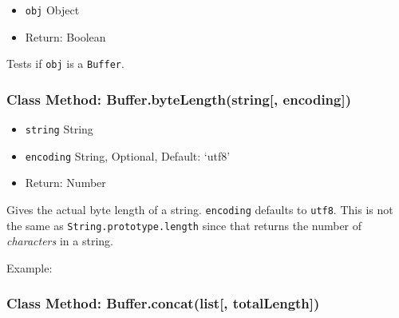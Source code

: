 \begin{itemize}
\itemsep1pt\parskip0pt
\item
  \texttt{obj} Object
\item
  Return: Boolean
\end{itemize}

Tests if \texttt{obj} is a \texttt{Buffer}.

\subsubsection{Class Method: Buffer.byteLength(string{[},
encoding{]})}\label{class-method-buffer.bytelengthstring-encoding}

\begin{itemize}
\itemsep1pt\parskip0pt
\item
  \texttt{string} String
\item
  \texttt{encoding} String, Optional, Default: `utf8'
\item
  Return: Number
\end{itemize}

Gives the actual byte length of a string. \texttt{encoding} defaults to
\texttt{\textquotesingle{}utf8\textquotesingle{}}. This is not the same
as \texttt{String.prototype.length} since that returns the number of
\emph{characters} in a string.

Example:

\begin{Shaded}
\begin{Highlighting}[]
\NormalTok{;}

 \NormalTok{+ } \NormalTok{+ } \NormalTok{+}
  \NormalTok{) + }\NormalTok{);}

\end{Highlighting}
\end{Shaded}

\subsubsection{Class Method: Buffer.concat(list{[},
totalLength{]})}\label{class-method-buffer.concatlist-totallength}

